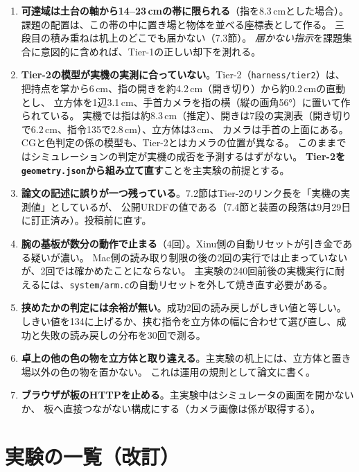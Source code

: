 \documentclass[11pt,a4paper]{article}
\begin{document}
\begin{enumerate}
\item \textbf{可達域は土台の軸から14--23\,cmの帯に限られる}（指を8.3\,cmとした場合）。
課題の配置は、この帯の中に置き場と物体を並べる座標表として作る。
三段目の積み重ねは机上のどこでも届かない（7.3節）。
\emph{届かない指示}を課題集合に意図的に含めれば、Tier-1の正しい却下を測れる。
\item \textbf{Tier-2の模型が実機の実測に合っていない}。Tier-2（\texttt{harness/tier2}）は、把持点を掌から6\,cm、指の開きを約4.2\,cm（開き切り）から約0.2\,cmの直動とし、
立方体を1辺3.1\,cm、手首カメラを指の横（縦の画角56°）に置いて作られている。
実機では指は約8.3\,cm（推定）、開きは7段の実測表（開き切りで6.2\,cm、指令135で2.8\,cm）、立方体は3\,cm、
カメラは手首の上面にある。CGと色判定の係の模型も、Tier-2とはカメラの位置が異なる。
このままではシミュレーションの判定が実機の成否を予測するはずがない。
\textbf{Tier-2を\texttt{geometry.json}から組み立て直す}ことを主実験の前提とする。
\item \textbf{論文の記述に誤りが一つ残っている}。7.2節はTier-2のリンク長を「実機の実測値」としているが、
公開URDFの値である（7.4節と装置の段落は9月29日に訂正済み）。投稿前に直す。
\item \textbf{腕の基板が数分の動作で止まる}（4回）。Xinu側の自動リセットが引き金である疑いが濃い。
Mac側の読み取り制限の後の2回の実行では止まっていないが、2回では確かめたことにならない。
主実験の240回前後の実機実行に耐えるには、\texttt{system/arm.c}の自動リセットを外して焼き直す必要がある。
\item \textbf{挟めたかの判定には余裕が無い}。成功2回の読み戻しがしきい値と等しい。
しきい値を134に上げるか、挟む指令を立方体の幅に合わせて選び直し、成功と失敗の読み戻しの分布を30回で測る。
\item \textbf{卓上の他の色の物を立方体と取り違える}。主実験の机上には、立方体と置き場以外の色の物を置かない。
これは運用の規則として論文に書く。
\item \textbf{ブラウザが板のHTTPを止める}。主実験中はシミュレータの画面を開かないか、
板へ直接つながない構成にする（カメラ画像は係が取得する）。
\end{enumerate}

\section{実験の一覧（改訂）}
\end{document}
